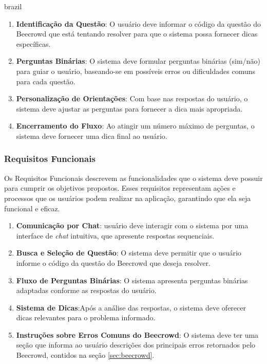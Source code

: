 \begin{otherlanguage*}{brazil}
\begin{enumerate}[label=RN\arabic* –]
    \item \textbf{Identificação da Questão}: O usuário deve informar o código da questão do Beecrowd que está tentando resolver para que o sistema possa fornecer dicas específicas.
    \item \textbf{Perguntas Binárias}: O sistema deve formular perguntas binárias (sim/não) para guiar o usuário, baseando-se em possíveis erros ou dificuldades comuns para cada questão.
    \item \textbf{Personalização de Orientações}: Com base nas respostas do usuário, o sistema deve ajustar as perguntas para fornecer a dica mais apropriada.
    \item \textbf{Encerramento do Fluxo}: Ao atingir um número máximo de perguntas, o sistema deve fornecer uma dica final ao usuário.
\end{enumerate}

\subsubsection{Requisitos Funcionais}

Os Requisitos Funcionais descrevem as funcionalidades que o sistema deve possuir para cumprir os objetivos propostos. Esses requisitos representam ações e processos que os usuários podem realizar na aplicação, garantindo que ela seja funcional e eficaz.

\begin{enumerate}[label=RF\arabic* –]
    \item \textbf{Comunicação por Chat}: usuário deve interagir com o sistema por uma interface de \textit{chat} intuitiva, que apresente respostas sequenciais.
    \item \textbf{Busca e Seleção de Questão}: O sistema deve permitir que o usuário informe o código da questão do Beecrowd que deseja resolver.
    \item \textbf{Fluxo de Perguntas Binárias}: O sistema apresenta perguntas binárias adaptadas conforme as respostas do usuário.
    \item \textbf{Sistema de Dicas}:Após a análise das respostas, o sistema deve oferecer dicas relevantes para o problema informado.
    \item \textbf{Instruções sobre Erros Comuns do Beecrowd}: O sistema deve ter uma seção que informa ao usuário descrições dos principais erros retornados pelo Beecrowd, contidos na seção \ref{sec:beecrowd}.
\end{enumerate}


\end{otherlanguage*}
